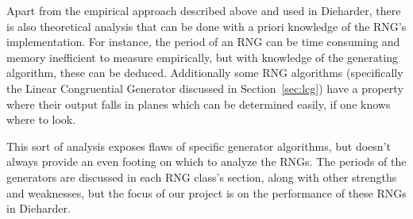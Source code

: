 Apart from the empirical approach described above and used in Dieharder, there is also theoretical analysis that can be done with a priori knowledge of the RNG's implementation. For instance, the period of an RNG can be time consuming and memory inefficient to measure empirically, but with knowledge of the generating algorithm, these can be deduced. Additionally some RNG algorithms (specifically the Linear Congruential Generator discussed in Section~\ref{sec:lcg}) have a property where their output falls in planes which can be determined easily, if one knows where to look.

This sort of analysis exposes flaws of specific generator algorithms, but doesn't always provide an even footing on which to analyze the RNGs. The periods of the generators are discussed in each RNG class's section, along with other strengths and weaknesses, but the focus of our project is on the performance of these RNGs in Dieharder.
